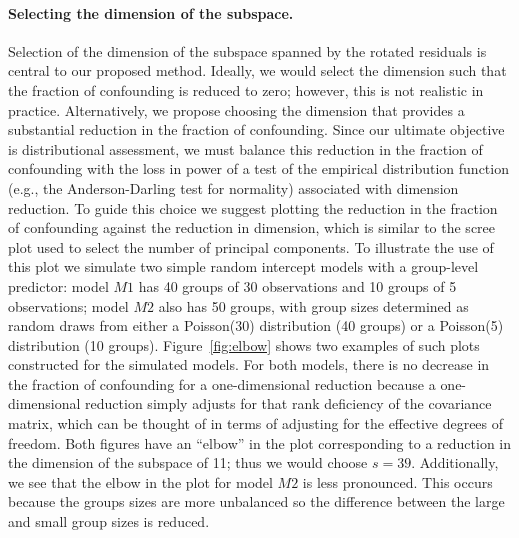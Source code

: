 \documentclass[12pt]{article} %
\newcommand{\al}[1]{{\color{red} #1}}
\begin{document}



\paragraph{Selecting the dimension of the subspace.}
Selection of the dimension of the subspace spanned by the rotated residuals is central to our proposed method. Ideally, we would select the dimension such that the fraction of confounding is reduced to zero; however, this is not realistic in practice. Alternatively, we propose choosing the dimension that provides a substantial reduction in the fraction of confounding. Since our ultimate objective is distributional assessment, we must balance this reduction in the fraction of confounding with the loss in power of a test of the empirical distribution function (e.g., the Anderson-Darling test for normality) associated with dimension reduction. To guide this choice we suggest plotting the reduction in the fraction of confounding against the reduction in dimension, which is similar to the scree plot used to select the number of principal components. To illustrate the use of this plot we simulate two simple random intercept models with a group-level predictor:   model $M1$ has 40 groups of 30 observations and 10 groups of 5 observations;   model $M2$ also has 50 groups, with group sizes determined as random draws from either a Poisson(30) distribution (40 groups) or a Poisson(5) distribution (10 groups). %
 Figure~\ref{fig:elbow} shows two examples of such plots constructed for the simulated models. For both models, there is no decrease in the fraction of confounding for a one-dimensional reduction because a {one-dimensional reduction} simply adjusts for that rank deficiency of the covariance matrix, which can be thought of in terms of adjusting for the effective degrees of freedom. Both figures have an ``elbow'' in the plot corresponding to a reduction in the dimension of the subspace of 11; thus we would choose $s = 39$. { Additionally, we see that the elbow in the plot for model $M2$ is less pronounced. This occurs because the groups sizes are more unbalanced so the difference between the large and small group sizes is reduced.}
 
\end{document}

